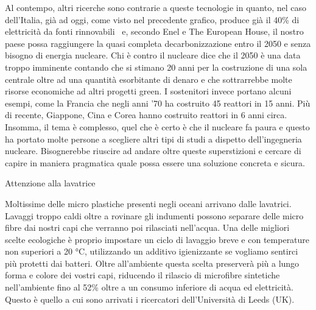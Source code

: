 \documentclass[12pt]{book} %
\begin{document}
Al contempo, altri ricerche sono contrarie a queste tecnologie in quanto, nel caso dell'Italia, già
ad oggi, come visto nel precedente grafico, produce già il 40\% di elettricità da fonti
rinnovabili
\ e, secondo Enel e The
European House, il nostro paese possa raggiungere la quasi completa decarbonizzazione entro il 2050 e senza bisogno di
energia
nucleare.
Chi è contro il nucleare dice che il 2050 è una data troppo imminente contando che si stimano 20 anni per la
costruzione di una sola centrale oltre ad una quantità esorbitante di
denaro e che sottrarrebbe molte risorse
economiche ad altri progetti green. I sostenitori
invece portano alcuni esempi, come la Francia che negli anni '70 ha costruito 45 reattori in 15 anni.
Più di recente, Giappone, Cina e Corea hanno costruito reattori in 6 anni circa. Insomma, il tema è complesso, quel che
è certo è che il nucleare fa paura e questo ha portato molte persone a scegliere altri tipi di studi a dispetto
dell'ingegneria nucleare. Bisognerebbe riuscire ad andare oltre queste superstizioni e cercare di
capire in maniera pragmatica quale possa essere una soluzione concreta e sicura. 


\bigskip
\begin{mdframed}[linewidth=1pt]
Attenzione alla lavatrice

Moltissime delle micro plastiche presenti negli oceani arrivano dalle lavatrici. Lavaggi troppo caldi oltre a rovinare
gli indumenti possono separare delle micro fibre dai nostri capi che verranno poi rilasciati
nell'acqua. Una delle migliori scelte ecologiche è proprio impostare un ciclo di lavaggio breve e
con temperature non superiori a 20 °C, utilizzando un additivo igienizzante se vogliamo sentirci più protetti dai
batteri. Oltre all'ambiente questa scelta preserverà più a lungo forma e colore dei vostri capi,
riducendo il rilascio di microfibre sintetiche nell'ambiente fino al 52\% oltre a un consumo inferiore di acqua ed
elettricità. Questo è quello a cui sono arrivati i ricercatori dell'Università di Leeds
(UK).
\end{mdframed}
\end{document}
